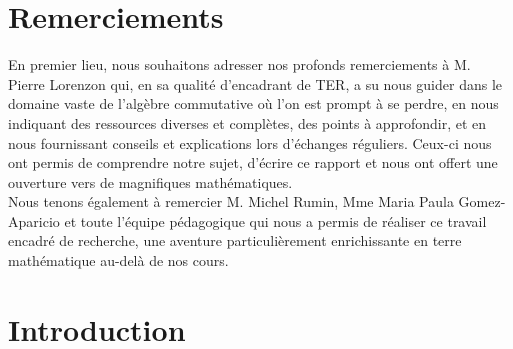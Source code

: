\documentclass[10pt, twoside]{article}
\theoremstyle{plain}
\theoremstyle{definition}
\theoremstyle{plain}
\theoremstyle{plain}
\theoremstyle{definition}
\theoremstyle{remark}
\begin{document}
\section*{Remerciements}
En premier lieu, nous souhaitons adresser nos profonds remerciements à M. Pierre Lorenzon qui, en sa qualité d'encadrant de TER, a su nous guider dans le domaine vaste de l'algèbre commutative où l'on est prompt à se perdre, en nous indiquant des ressources diverses et complètes, des points à approfondir, et en nous fournissant conseils et explications lors d'échanges réguliers. Ceux-ci nous ont permis de comprendre notre sujet, d'écrire ce rapport et nous ont offert une ouverture vers de magnifiques mathématiques.\\
Nous tenons également à remercier M. Michel Rumin, Mme Maria Paula Gomez-Aparicio et toute l'équipe pédagogique qui nous a permis de réaliser ce travail encadré de recherche, une aventure particulièrement enrichissante en terre mathématique au-delà de nos cours.

\newpage
\pagestyle{plain}
\tableofcontents

\newpage
\pagestyle{fancy}
\fancyhead{}
\fancyhead[LO]{\leftmark}
\fancyhead[RE]{\rightmark}
\section{Introduction}
\end{document}
